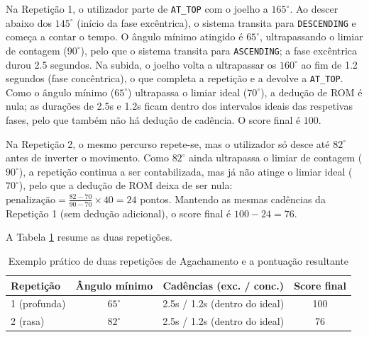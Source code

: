 Na Repetição 1, o utilizador parte de \texttt{AT\_TOP} com o joelho a $165^\circ$. Ao descer abaixo dos $145^\circ$ (início da fase excêntrica), o sistema transita para \texttt{DESCENDING} e começa a contar o tempo. O ângulo mínimo atingido é $65^\circ$, ultrapassando o limiar de contagem ($90^\circ$), pelo que o sistema transita para \texttt{ASCENDING}; a fase excêntrica durou 2.5 segundos. Na subida, o joelho volta a ultrapassar os $160^\circ$ ao fim de 1.2 segundos (fase concêntrica), o que completa a repetição e a devolve a \texttt{AT\_TOP}. Como o ângulo mínimo ($65^\circ$) ultrapassa o limiar ideal ($70^\circ$), a dedução de ROM é nula; as durações de 2.5s e 1.2s ficam dentro dos intervalos ideais das respetivas fases, pelo que também não há dedução de cadência. O score final é $100$.

Na Repetição 2, o mesmo percurso repete-se, mas o utilizador só desce até $82^\circ$ antes de inverter o movimento. Como $82^\circ$ ainda ultrapassa o limiar de contagem ($90^\circ$), a repetição continua a ser contabilizada, mas já não atinge o limiar ideal ($70^\circ$), pelo que a dedução de ROM deixa de ser nula: $\text{penalização} = \frac{82-70}{90-70} \times 40 = 24$ pontos. Mantendo as mesmas cadências da Repetição 1 (sem dedução adicional), o score final é $100 - 24 = 76$.

A Tabela \ref{tab:exemploPratico} resume as duas repetições.

\begin{table}[H]
   \centering
   \begin{tabular}{lccc}
      \textbf{Repetição} & \textbf{Ângulo mínimo} & \textbf{Cadências (exc. / conc.)} & \textbf{Score final} \\
      \hline
      1 (profunda) & $65^\circ$ & 2.5s / 1.2s (dentro do ideal) & 100 \\
      2 (rasa) & $82^\circ$ & 2.5s / 1.2s (dentro do ideal) & 76 \\
      \hline
   \end{tabular}
   \caption{Exemplo prático de duas repetições de Agachamento e a pontuação resultante}
   \label{tab:exemploPratico}
\end{table}